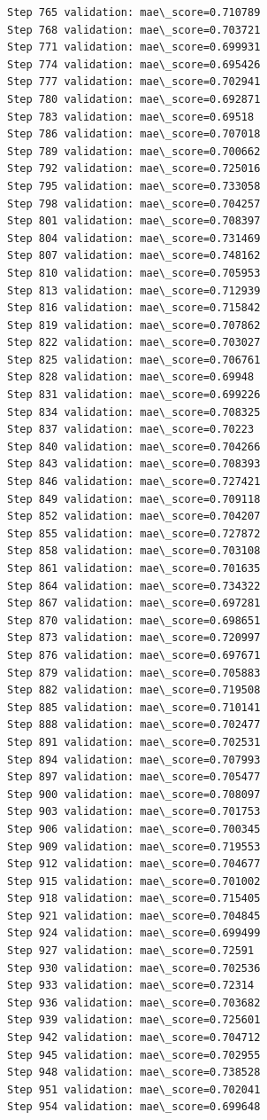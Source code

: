 \documentclass[11pt]{article}
\begin{document}
\begin{Verbatim}[commandchars=\\\{\}]
Step 765 validation: mae\_score=0.710789
Step 768 validation: mae\_score=0.703721
Step 771 validation: mae\_score=0.699931
Step 774 validation: mae\_score=0.695426
Step 777 validation: mae\_score=0.702941
Step 780 validation: mae\_score=0.692871
Step 783 validation: mae\_score=0.69518
Step 786 validation: mae\_score=0.707018
Step 789 validation: mae\_score=0.700662
Step 792 validation: mae\_score=0.725016
Step 795 validation: mae\_score=0.733058
Step 798 validation: mae\_score=0.704257
Step 801 validation: mae\_score=0.708397
Step 804 validation: mae\_score=0.731469
Step 807 validation: mae\_score=0.748162
Step 810 validation: mae\_score=0.705953
Step 813 validation: mae\_score=0.712939
Step 816 validation: mae\_score=0.715842
Step 819 validation: mae\_score=0.707862
Step 822 validation: mae\_score=0.703027
Step 825 validation: mae\_score=0.706761
Step 828 validation: mae\_score=0.69948
Step 831 validation: mae\_score=0.699226
Step 834 validation: mae\_score=0.708325
Step 837 validation: mae\_score=0.70223
Step 840 validation: mae\_score=0.704266
Step 843 validation: mae\_score=0.708393
Step 846 validation: mae\_score=0.727421
Step 849 validation: mae\_score=0.709118
Step 852 validation: mae\_score=0.704207
Step 855 validation: mae\_score=0.727872
Step 858 validation: mae\_score=0.703108
Step 861 validation: mae\_score=0.701635
Step 864 validation: mae\_score=0.734322
Step 867 validation: mae\_score=0.697281
Step 870 validation: mae\_score=0.698651
Step 873 validation: mae\_score=0.720997
Step 876 validation: mae\_score=0.697671
Step 879 validation: mae\_score=0.705883
Step 882 validation: mae\_score=0.719508
Step 885 validation: mae\_score=0.710141
Step 888 validation: mae\_score=0.702477
Step 891 validation: mae\_score=0.702531
Step 894 validation: mae\_score=0.707993
Step 897 validation: mae\_score=0.705477
Step 900 validation: mae\_score=0.708097
Step 903 validation: mae\_score=0.701753
Step 906 validation: mae\_score=0.700345
Step 909 validation: mae\_score=0.719553
Step 912 validation: mae\_score=0.704677
Step 915 validation: mae\_score=0.701002
Step 918 validation: mae\_score=0.715405
Step 921 validation: mae\_score=0.704845
Step 924 validation: mae\_score=0.699499
Step 927 validation: mae\_score=0.72591
Step 930 validation: mae\_score=0.702536
Step 933 validation: mae\_score=0.72314
Step 936 validation: mae\_score=0.703682
Step 939 validation: mae\_score=0.725601
Step 942 validation: mae\_score=0.704712
Step 945 validation: mae\_score=0.702955
Step 948 validation: mae\_score=0.738528
Step 951 validation: mae\_score=0.702041
Step 954 validation: mae\_score=0.699648

\end{Verbatim}
\end{document}
